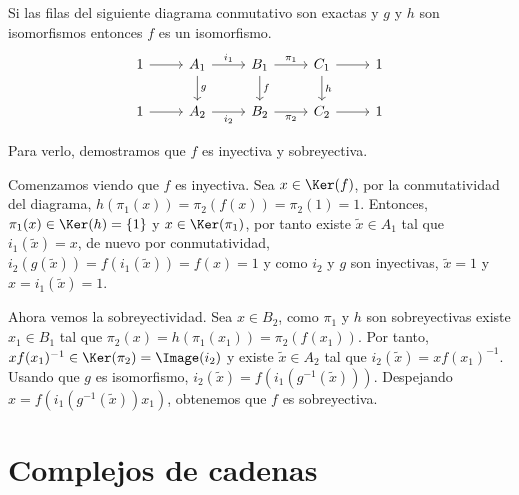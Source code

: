\begin{proposicion}\label{prop:sflem}
	Si las filas del siguiente diagrama conmutativo son exactas y $g$ y $h$ son isomorfismos entonces $f$ es un isomorfismo.
	\[\begin{tikzcd}
		1 & {A_1} & {B_1} & {C_1} & 1 \\
		1 & {A_2} & {B_2} & {C_2} & 1
		\arrow["g", from=1-2, to=2-2]
		\arrow["{i_1}", from=1-2, to=1-3]
		\arrow["{\pi_1}", from=1-3, to=1-4]
		\arrow["f", from=1-3, to=2-3]
		\arrow["{i_2}"', from=2-2, to=2-3]
		\arrow["{\pi_2}"', from=2-3, to=2-4]
		\arrow["h", from=1-4, to=2-4]
		\arrow[from=1-4, to=1-5]
		\arrow[from=2-1, to=2-2]
		\arrow[from=1-1, to=1-2]
		\arrow[from=2-4, to=2-5]
	\end{tikzcd}\]
	\begin{demostracion}
		Para verlo, demostramos que $f$ es inyectiva y sobreyectiva.
		
		Comenzamos viendo que $f$ es inyectiva. Sea $x\in \Ker(f)$, por la conmutatividad del diagrama, $h(\pi_1(x))=\pi_2(f(x)) = \pi_2(1) = 1$. Entonces, $\pi_1(x)\in \Ker(h) = \{1\}$ y $x\in \Ker(\pi_1)$, por tanto existe $\tilde x\in A_1$ tal que $i_1(\tilde x)=x$, de nuevo por conmutatividad, $i_2(g(\tilde x))=f(i_1(\tilde x))=f(x)=1$ y como $i_2$ y $g$ son inyectivas, $\tilde x = 1$ y $x = i_1(\tilde x)=1$.
		
		Ahora vemos la sobreyectividad. Sea $x\in B_2$, como $\pi_1$ y $h$ son sobreyectivas existe $ x_1\in B_1$ tal que $\pi_2(x)=h(\pi_1(x_1)) = \pi_2(f(x_1))$. Por tanto, $x f(x_1)^{-1} \in \Ker(\pi_2)= \Image(i_2)$ y existe $\tilde x\in A_2$ tal que $i_2(\tilde x)=x f(x_1)^{-1}$. Usando que $g$ es isomorfismo, $i_2(\tilde x) = f(i_1(g^{-1}(\tilde x)))$. Despejando $x = f(i_1(g^{-1}(\tilde x)) x_1)$, obtenemos que $f$ es sobreyectiva.
	\end{demostracion}
\end{proposicion}



\section{Complejos de cadenas}

